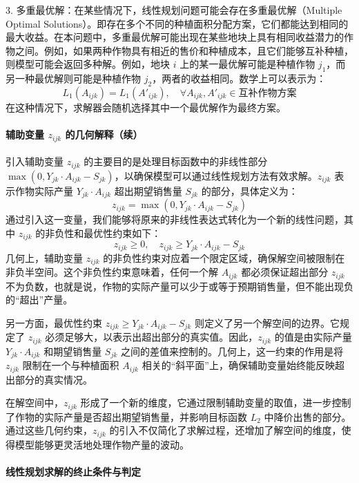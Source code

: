 \documentclass[12pt,a4paper]{nmmcm}
\begin{document}
3. 多重最优解：在某些情况下，线性规划问题可能会存在多重最优解（Multiple Optimal Solutions）。即存在多个不同的种植面积分配方案，它们都能达到相同的最大收益。在本问题中，多重最优解可能出现在某些地块上具有相同收益潜力的作物之间。例如，如果两种作物具有相近的售价和种植成本，且它们能够互补种植，则模型可能会返回多种解。例如，地块 $i$ 上的某一最优解可能是种植作物 $j_1$，而另一种最优解则可能是种植作物 $j_2$，两者的收益相同。数学上可以表示为：
\[
  L_1(A_{ijk}) = L_1(A'_{ijk}), \quad \forall A_{ijk}, A'_{ijk} \in \text{互补作物方案}
\]
在这种情况下，求解器会随机选择其中一个最优解作为最终方案。




\paragraph{辅助变量 $z_{ijk}$ 的几何解释（续）}

引入辅助变量 $z_{ijk}$ 的主要目的是处理目标函数中的非线性部分 $\max(0, Y_{jk} \cdot A_{ijk} - S_{jk})$，以确保模型可以通过线性规划方法有效求解。$z_{ijk}$ 表示作物实际产量 $Y_{jk} \cdot A_{ijk}$ 超出期望销售量 $S_{jk}$ 的部分，具体定义为：
\[
z_{ijk} = \max(0, Y_{jk} \cdot A_{ijk} - S_{jk})
\]
通过引入这一变量，我们能够将原来的非线性表达式转化为一个新的线性问题，其中 $z_{ijk}$ 的非负性和最优性约束如下：
\[
z_{ijk} \geq 0, \quad z_{ijk} \geq Y_{jk} \cdot A_{ijk} - S_{jk}
\]
几何上，辅助变量 $z_{ijk}$ 的非负性约束对应着一个限定区域，确保解空间被限制在非负半空间。这个非负性约束意味着，任何一个解 $A_{ijk}$ 都必须保证超出部分 $z_{ijk}$ 不为负数，也就是说，作物的实际产量可以少于或等于预期销售量，但不能出现负的“超出”产量。

另一方面，最优性约束 $z_{ijk} \geq Y_{jk} \cdot A_{ijk} - S_{jk}$ 则定义了另一个解空间的边界。它规定了 $z_{ijk}$ 必须足够大，以表示出超出部分的真实值。因此，$z_{ijk}$ 的值是由实际产量 $Y_{jk} \cdot A_{ijk}$ 和期望销售量 $S_{jk}$ 之间的差值来控制的。几何上，这一约束的作用是将 $z_{ijk}$ 限制在一个与种植面积 $A_{ijk}$ 相关的“斜平面”上，确保辅助变量始终能反映超出部分的真实情况。

在解空间中，$z_{ijk}$ 形成了一个新的维度，它通过限制辅助变量的取值，进一步控制了作物的实际产量是否超出期望销售量，并影响目标函数 $L_2$ 中降价出售的部分。通过这些几何约束，$z_{ijk}$ 的引入不仅简化了求解过程，还增加了解空间的维度，使得模型能够更灵活地处理作物产量的波动。

\paragraph{线性规划求解的终止条件与判定}
\end{document}

